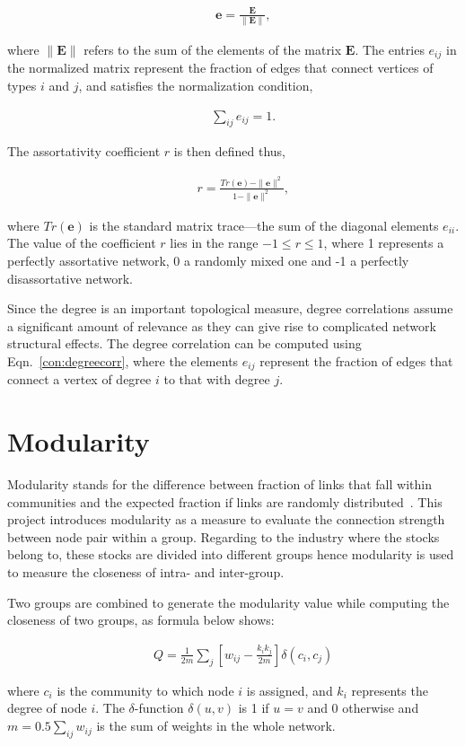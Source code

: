 \begin{eqnarray}
&&\mathbf{e}=\frac{\mathbf{E}}{\|\mathbf{E}\|},
\end{eqnarray}

where $\|\mathbf{E}\|$ refers to the sum of the elements of the matrix $\mathbf{E}$. The entries $e_{ij}$ in the normalized matrix represent the fraction of edges that connect vertices of types $i$ and $j$, and satisfies the normalization condition,

\begin{eqnarray}
&&\sum_{ij}e_{ij}=1.
\end{eqnarray}

The assortativity coefficient $r$ is then defined thus,

\begin{eqnarray}
&&r=\frac{Tr(\mathbf{e})-\|\mathbf{e}\|^2}{1-\|\mathbf{e}\|^2},\label{con:degreecorr}
\end{eqnarray}

where $Tr(\mathbf{e})$ is the standard matrix trace—the sum of the diagonal elements $e_{ii}$. The value of the coefficient $r$ lies in the range $-1\leq{r}\leq{1}$, where 1 represents a perfectly assortative network, 0 a randomly mixed one and -1 a perfectly disassortative network.

Since the degree is an important topological measure, degree correlations assume a significant amount of relevance as they can give rise to complicated network structural effects. The degree correlation can be computed using Eqn.~\ref{con:degreecorr}, where the elements $e_{ij}$ represent the fraction of edges that connect a vertex of degree $i$ to that with degree $j$.

\section{Modularity}
Modularity stands for the difference between fraction of links that fall within communities and the expected fraction if links are randomly distributed~\cite{newman2004finding}. This project introduces modularity as a measure to evaluate the connection strength between node pair within a group. Regarding to the industry where the stocks belong to, these stocks are divided into different groups hence modularity is used to measure the closeness of intra- and inter-group.

Two groups are combined to generate the modularity value while computing the closeness of two groups, as formula below shows:

\begin{eqnarray}
&&Q=\frac{1}{2m}\sum_{j}\left[w_{ij}-\frac{k_ik_j}{2m}\right]\delta\left(c_i,c_j\right)
\end{eqnarray}

where $c_i$ is the community to which node $i$ is assigned, and $k_i$ represents the degree of node $i$. The $\delta$-function $\delta(u,v)$ is 1 if $u=v$ and 0 otherwise and $m=0.5\sum_{ij}w_{ij}$ is the sum of weights in the whole network.